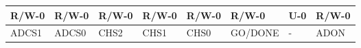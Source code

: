 \documentclass[12pt,twoside]{article}
\begin{document}
\bigskip

\begin{longtable}[c]{p{1.924cm}p{1.924cm}p{1.924cm}p{1.924cm}p{1.924cm}p{1.924cm}p{1.924cm}p{1.924cm}}

R/W{}-0
&
R/W{}-0 
&
R/W{}-0 
&
R/W{}-0 
&
R/W{}-0 
&
R/W{}-0 
&
U{}-0
&
R/W{}-0
\\\hline
\multicolumn{1}{|p{1.924cm}|}{ADCS1
}&
\multicolumn{1}{p{1.924cm}|}{ADCS0
}&
\multicolumn{1}{p{1.924cm}|}{CHS2
}&
\multicolumn{1}{p{1.924cm}|}{CHS1
}&
\multicolumn{1}{p{1.924cm}|}{CHS0
}&
\multicolumn{1}{p{1.924cm}|}{GO/DONE
}&
\multicolumn{1}{p{1.924cm}|}{{}-
}&
\multicolumn{1}{p{1.924cm}|}{ADON
}\\\hline
\end{longtable}

\bigskip
\end{document}
